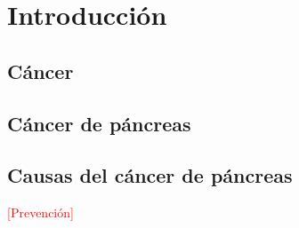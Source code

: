 \chapter{Introducción}

\section{Cáncer}


\section{Cáncer de páncreas}


\section{Causas del cáncer de páncreas}

\textcolor{red}{[Prevención]}
